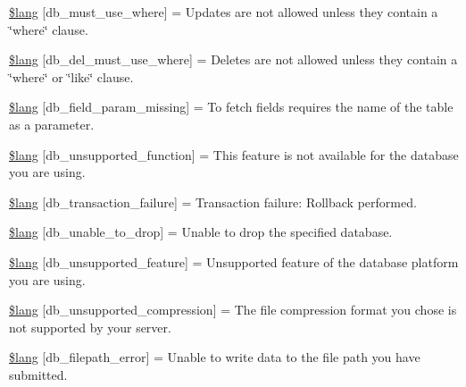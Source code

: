 \begin{DoxyCompactItemize}
\item 
\mbox{\hyperlink{db__lang_8php_a2a744fb7156ec6fa5e103c1af04b4db2}{\$lang}} \mbox{[}\textquotesingle{}db\+\_\+must\+\_\+use\+\_\+where\textquotesingle{}\mbox{]} = \textquotesingle{}Updates are not allowed unless they contain a \char`\"{}where\char`\"{} clause.\textquotesingle{}
\item 
\mbox{\hyperlink{db__lang_8php_a9dae040ef4bd563b5ed5df288c98d356}{\$lang}} \mbox{[}\textquotesingle{}db\+\_\+del\+\_\+must\+\_\+use\+\_\+where\textquotesingle{}\mbox{]} = \textquotesingle{}Deletes are not allowed unless they contain a \char`\"{}where\char`\"{} or \char`\"{}like\char`\"{} clause.\textquotesingle{}
\item 
\mbox{\hyperlink{db__lang_8php_a80033cf90bcb8c6b9db4593fd6e2c810}{\$lang}} \mbox{[}\textquotesingle{}db\+\_\+field\+\_\+param\+\_\+missing\textquotesingle{}\mbox{]} = \textquotesingle{}To fetch fields requires the name of the table as a parameter.\textquotesingle{}
\item 
\mbox{\hyperlink{db__lang_8php_aed09746af6105cd39f2cc6ffaa96740a}{\$lang}} \mbox{[}\textquotesingle{}db\+\_\+unsupported\+\_\+function\textquotesingle{}\mbox{]} = \textquotesingle{}This feature is not available for the database you are using.\textquotesingle{}
\item 
\mbox{\hyperlink{db__lang_8php_ad6164b67b0187b403166c652a8503ace}{\$lang}} \mbox{[}\textquotesingle{}db\+\_\+transaction\+\_\+failure\textquotesingle{}\mbox{]} = \textquotesingle{}Transaction failure\+: Rollback performed.\textquotesingle{}
\item 
\mbox{\hyperlink{db__lang_8php_a1c70abccf684437ff6e0d83e1ca1b791}{\$lang}} \mbox{[}\textquotesingle{}db\+\_\+unable\+\_\+to\+\_\+drop\textquotesingle{}\mbox{]} = \textquotesingle{}Unable to drop the specified database.\textquotesingle{}
\item 
\mbox{\hyperlink{db__lang_8php_a21ca7e58bb09c70a6cb55a8c285ff3e4}{\$lang}} \mbox{[}\textquotesingle{}db\+\_\+unsupported\+\_\+feature\textquotesingle{}\mbox{]} = \textquotesingle{}Unsupported feature of the database platform you are using.\textquotesingle{}
\item 
\mbox{\hyperlink{db__lang_8php_a5537af909553ea18053324d63154b49f}{\$lang}} \mbox{[}\textquotesingle{}db\+\_\+unsupported\+\_\+compression\textquotesingle{}\mbox{]} = \textquotesingle{}The file compression format you chose is not supported by your server.\textquotesingle{}
\item 
\mbox{\hyperlink{db__lang_8php_ab7a05ad84cc1f2f472051d11e1efbcc7}{\$lang}} \mbox{[}\textquotesingle{}db\+\_\+filepath\+\_\+error\textquotesingle{}\mbox{]} = \textquotesingle{}Unable to write data to the file path you have submitted.\textquotesingle{}

\end{DoxyCompactItemize}
